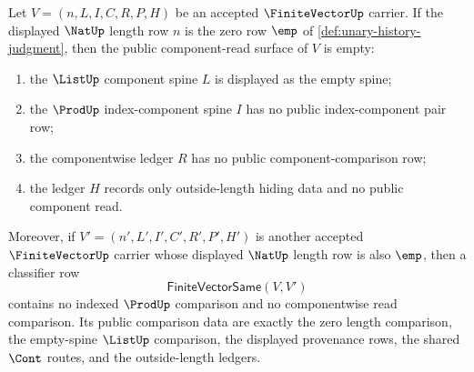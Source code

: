 \begin{theorem}
\label{thm:finitevector-zero-length-empty-component-read-surface}
Let $V=(n,L,I,C,R,P,H)$ be an accepted $\FiniteVectorUp$ carrier. If the displayed $\NatUp$ length row $n$ is the zero row $\emp$ of \autoref{def:unary-history-judgment}, then the public component-read surface of $V$ is empty:
\begin{enumerate}
\item the $\ListUp$ component spine $L$ is displayed as the empty spine;
\item the $\ProdUp$ index-component spine $I$ has no public index-component pair row;
\item the componentwise ledger $R$ has no public component-comparison row;
\item the ledger $H$ records only outside-length hiding data and no public component read.
\end{enumerate}
Moreover, if $V'=(n',L',I',C',R',P',H')$ is another accepted $\FiniteVectorUp$ carrier whose displayed $\NatUp$ length row is also $\emp$, then a classifier row
$$
\mathsf{FiniteVectorSame}(V,V')
$$
contains no indexed $\ProdUp$ comparison and no componentwise read comparison. Its public comparison data are exactly the zero length comparison, the empty-spine $\ListUp$ comparison, the displayed provenance rows, the shared $\Cont$ routes, and the outside-length ledgers.
\end{theorem}
